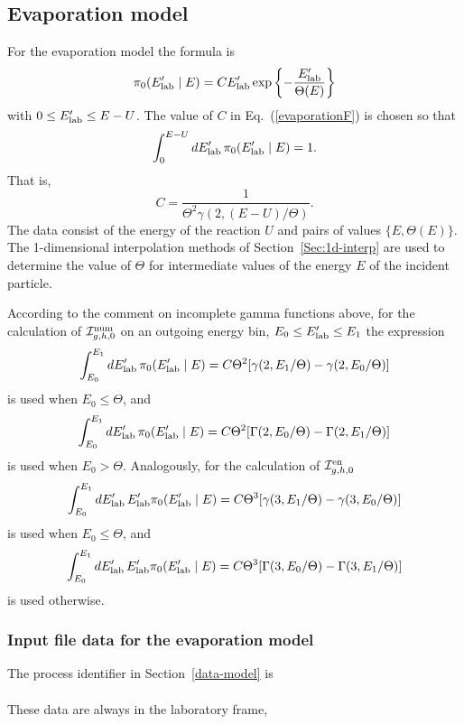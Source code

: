 \subsection{Evaporation model}
For the evaporation model the formula is
\begin{equation}
  \pi_0(E_{\text{lab}}' \mid E) = C E_{\text{lab}}' \exp\left\{- \frac{E_{\text{lab}}'}{\Theta(E)}\right\}
 \label{evaporationF}
\end{equation}
with $0 \le E_{\text{lab}}' \le E - U$.  The value of $C$ in Eq.~(\ref{evaporationF})
is chosen so that
$$
  \int_0^{E - U} dE_{\text{lab}}' \, \pi_0(E_{\text{lab}}' \mid E) = 1.
$$
That is, 
$$
  C = \frac{1}{\Theta^2 \gamma(2, (E - U)/\Theta)}.
$$
The data consist of the energy of the reaction $U$ and pairs of
values $\{E, \Theta(E)\}$.  The 1-dimensional interpolation methods
of Section~\ref{Sec:1d-interp} are used to
determine the value of $\Theta$ for intermediate values of the 
energy $E$ of the incident particle.

According to the comment on incomplete gamma functions above,
for the calculation of ${\cal I}^{\text{num}}_{g,h,0}$ on an outgoing energy bin,
$E_0 \le E_{\text{lab}}' \le E_1$ the expression
$$
  \int_{E_0}^{E_1} dE_{\text{lab}}' \, \pi_0(E_{\text{lab}}' \mid E) =
   C\Theta^2[\gamma(2, E_1/\Theta) - \gamma(2, E_0/\Theta)]
$$
is used when $E_0 \le \Theta$, and
$$
  \int_{E_0}^{E_1} dE_{\text{lab}}' \, \pi_0(E_{\text{lab}}' \mid E) =
   C\Theta^2[\Gamma(2, E_0/\Theta) - \Gamma(2, E_1/\Theta)]
$$
is used when $E_0 > \Theta$.  Analogously, for the
calculation of ${\cal I}^{\text{en}}_{g,h,0}$
$$
  \int_{E_0}^{E_1} dE_{\text{lab}}' \, E_{\text{lab}}' \pi_0(E_{\text{lab}}' \mid E) =
   C\Theta^3[\gamma(3, E_1/\Theta) - \gamma(3, E_0/ \Theta)]
$$
is used when $E_0 \le \Theta$, and
$$
  \int_{E_0}^{E_1} dE_{\text{lab}}' \, E_{\text{lab}}' \pi_0(E_{\text{lab}}'  \mid E) =
   C\Theta^3[\Gamma(3, E_0/\Theta) - \Gamma(3, E_1/\Theta)]
$$
is used otherwise.

\subsubsection{Input file data for the evaporation model}
The process identifier in Section~\ref{data-model} is\\
  \\
These data are always in the laboratory frame,\\

